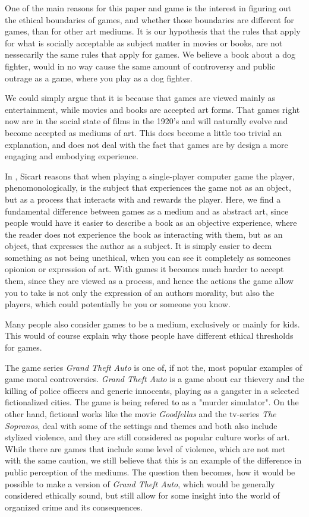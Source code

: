 One of the main reasons for this paper and game is the interest in figuring out the ethical boundaries of games, and whether those boundaries are different for games, than for other art mediums. It is our hypothesis that the rules that apply for what is socially acceptable as subject matter in movies or books, are not nessecarily the same rules that apply for games. We believe a book about a dog fighter, would in no way cause the same amount of controversy and public outrage as a game, where you play as a dog fighter. \

We could simply argue that it is because that games are viewed mainly as entertainment, while movies and books are accepted art forms. That games right now are in the social state of films in the 1920's and will naturally evolve and become accepted as mediums of art. This does become a little too trivial an explanation, and does not deal with the fact that games are by design a more engaging and embodying experience.\

In \citep{sicart2011ethics}, Sicart reasons that when playing a single-player computer game the player, phenomonologically, is the subject that experiences the game not as an object, but as a process that interacts with and rewards the player. Here, we find a fundamental difference between games as a medium and as abstract art, since people would have it easier to describe a book as an objective experience, where the reader does not experience the book as interacting with them, but as an object, that expresses the author as a subject. It is simply easier to deem something as not being unethical, when you can see it completely as someones opionion or expression of art. With games it becomes much harder to accept them, since they are viewed as a process, and hence the actions the game allow you to take is not only the expression of an authors morality, but also the players, which could potentially be you or someone you know. \

Many people also consider games to be a medium, exclusively or mainly for kids. This would of course explain why those people have different ethical thresholds for games. \

The game series \textit{Grand Theft Auto}\cite{north2013grand} is one of, if not the, most popular examples of game moral controversies. \textit{Grand Theft Auto} is a game about car thievery and the killing of police officers and generic innocents, playing as a gangster in a selected fictionalized cities. The game is being refered to as a "murder simulator"\cite{murdersim}. On the other hand, fictional works like the movie \textit{Goodfellas} and the tv-series \textit{The Sopranos}, deal with some of the settings and themes and both also include stylized violence, and they are still considered as popular culture works of art.\cite{sicart2011ethics} While there are games that include some level of violence, which are not met with the same caution, we still believe that this is an example of the difference in public perception of the mediums. The question then becomes, how it would be possible to make a version of \textit{Grand Theft Auto}, which would be generally considered ethically sound, but still allow for some insight into the world of organized crime and its consequences.\

